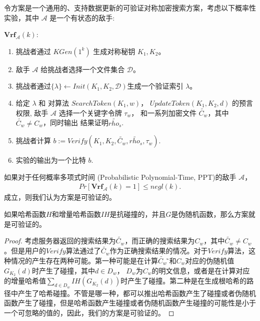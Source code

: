 \begin{definition}
  \itshape{
      令方案\single 是一个通用的、支持数据更新的可验证对称加密搜索方案，考虑以下概率性实验，其中 $\mathcal{A}$ 是一个有状态的敌手:

      \noindent$\mathbf{Vrf}_\mathcal{A}(k)$:
      \begin{enumerate}[1.]
        \item 挑战者通过 $KGen(1^k)$ 生成对称秘钥 $K_1,K_2$。
        \item 敌手 $\mathcal{A}$ 给挑战者选择一个文件集合 $\mathcal{D}$。
        \item 挑战者通过$\{\lambda\} \leftarrow Init(K_1,K_2,\mathcal{D})$生成一个验证索引 $\lambda$。
        \item 给定 $\lambda$ 和 对算法 $SearchToken(K_1,w)$， $UpdateToken(K_1,K_2,d)$ 的预言权限, 敌手 $\mathcal{A}$ 选择一个关键字令牌 $\tau_w$， 和一系列加密文件 $\tilde{C_w}$，其中 $\tilde{C_w} \neq C_w$，同时输出%
        结果证明$\tilde{rho_s}$.
        \item 挑战者计算 $b:=Verify(K_1,K_2,\tilde{C_w},\tilde{rho_s},\tau_w)$.
        \item 实验的输出为一个比特 $b$.
      \end{enumerate}
      如果对于任何概率多项式时间 (Probabilistic Polynomial-Time, PPT)的敌手 $\mathcal{A}$，
      \begin{align}
        Pr[\mathbf{Vrf}_\mathcal{A}(k)=1] \leq negl(k).
      \end{align}
      成立，则我们认为\single 方案是可验证的。
  }
\end{definition}

\begin{theorem}
    如果哈希函数$H$和增量哈希函数$IH$是抗碰撞的，并且$G$是伪随机函数，那么\single 方案就是可验证的。
\end{theorem}

\begin{proof}
  考虑服务器返回的搜索结果为$\tilde{C_w}$，而正确的搜索结果为$C_w$，其中$\tilde{C_w} \neq C_w$。但是用户的$Verify$算法通过了$\tilde{C_w}$作为正确搜索结果的情况。对于$Verify$算法，这种情况的产生存在两种可能。第一种可能是在计算$\tilde{C_w}$ ̃和$C_w$对应的伪随机值$G_{K_2}(d)$时产生了碰撞，其中$d \in D_w$， $D_w$为$C_w$的明文信息，或者是在计算对应的增量哈希值$\sum_{d \in D_{w}}IH (G_{K_2} (d))$时产生了碰撞。第二种是在生成根哈希的路径中产生了哈希碰撞。不管是哪一种，都可以推出哈希函数产生了碰撞或者伪随机函数产生了碰撞，但是哈希函数产生碰撞或者伪随机函数产生碰撞的可能性是小于一个可忽略的值的，因此，我们的方案是可验证的。
\end{proof}


